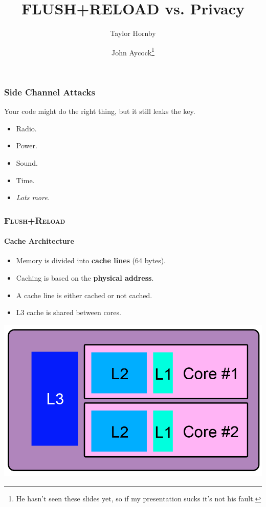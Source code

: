 \documentclass{beamer}
\title{FLUSH+RELOAD vs. Privacy}
\author{Taylor Hornby \and John Aycock\footnote{He hasn't seen these
slides yet, so if my presentation sucks it's not his fault.}}
\begin{document}
    \frame{\titlepage}

\begin{frame}
    \frametitle{Side Channel Attacks}
    Your code might do the right thing, but it still leaks the key.
    \begin{itemize}
        \item Radio.
        \item Power.
        \item Sound.
        \item Time.
        \item \emph{Lots more.}
    \end{itemize}
\end{frame}


\begin{frame}
    \frametitle{\textsc{Flush+Reload}}
    \framesubtitle{Cache Architecture}

    \begin{itemize}
        \item Memory is divided into \textbf{cache lines} (64 bytes).
        \item Caching is based on the \textbf{physical address}.
        \item A cache line is either cached or not cached.
        \item L3 cache is shared between cores.
    \end{itemize}

    \begin{center}
        \includegraphics{cachearch.png}
    \end{center}

\end{frame}
\end{document}
